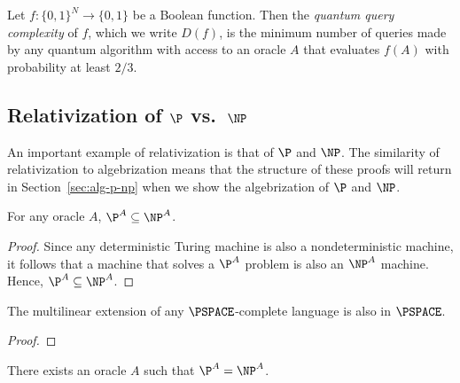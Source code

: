 \begin{defn}[{\cite[17]{AW09}}]\label{def:quant-qc}
  Let $f: \{0, 1\}^{N} \rightarrow \{0, 1\}$ be a Boolean function. Then the
  \emph{quantum query complexity} of $f$, which we write $D(f)$, is the
  minimum number of queries made by any quantum algorithm with access to an
  oracle $A$ that evaluates $f(A)$ with probability at least $2/3$.
\end{defn}

\subsection{Relativization of $\P$ vs.\ $\NP$}\label{sec:rel-p-np}

An important example of relativization is that of $\P$ and $\NP$. The similarity
of relativization to algebrization means that the structure of these proofs will
return in Section~\ref{sec:alg-p-np} when we show the algebrization of $\P$ and
$\NP$.

\begin{lemma}
  For any oracle $A$, $\P^{A} \subseteq \NP^{A}$.
\end{lemma}

\begin{proof}
  Since any deterministic Turing machine is also a nondeterministic machine, it
  follows that a machine that solves a $\P^{A}$ problem is also an $\NP^{A}$
  machine. Hence, $\P^{A} \subseteq \NP^{A}$.
\end{proof}

\begin{lemma} %
  The multilinear extension of any $\PSPACE$-complete language is also in
  $\PSPACE$.
\end{lemma}

\begin{proof}
\end{proof}

\begin{thm}\label{thm:p-np-rel}
  There exists an oracle $A$ such that $\P^{A} = \NP^{A}$.
\end{thm}

